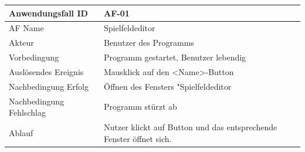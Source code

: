 \documentclass[11pt,a4paper]{article}
\begin{document}
\pagebreak

\par

\begin{tabular}[m]{|m{7cm}|m{9cm}|}
    \hline
    Anwendungsfall ID     & AF-01 \\
         \hline
    AF Name     &  Spielfeldeditor \\
         \hline
    Akteur&Benutzer des Programms \\
    \hline
    Vorbedingung&Programm gestartet, Benutzer lebendig\\
    \hline
    Auslösendes Ereignis&Mausklick auf den <Name>-Button\\
    \hline
    Nachbedingung Erfolg&Öffnen des Fensters "Spielfeldeditor\\
    \hline
    Nachbedingung Fehlschlag&Programm stürzt ab\\
    \hline
    Ablauf&Nutzer klickt auf Button und das entsprechende Fenster öffnet sich.\\
    \hline
\end{tabular}
\par
\end{document}
